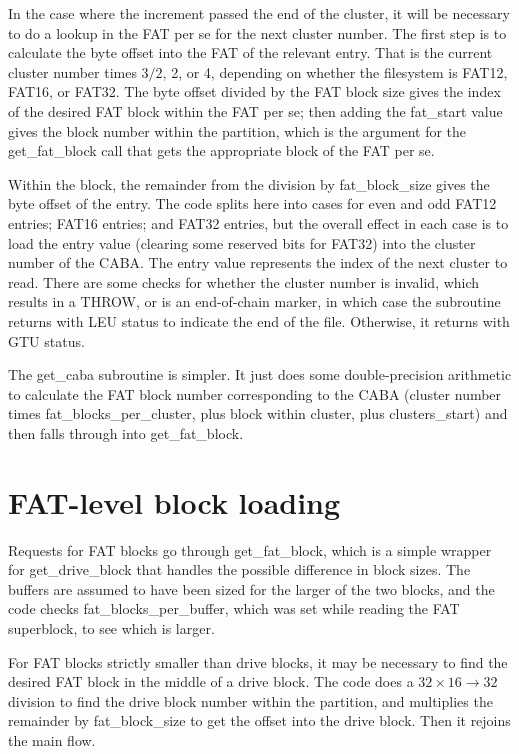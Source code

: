 In the case where the increment passed the end of the cluster, it will be
necessary to do a lookup in the FAT per se for the next cluster number.  The
first step is to calculate the byte offset into the FAT of the relevant
entry.  That is the current cluster number times $3/2$, 2, or 4, depending
on whether the filesystem is FAT12, FAT16, or FAT32.  The byte offset
divided by the FAT block size gives the index of the desired FAT block
within the FAT per se; then adding the fat\_start value gives the block
number within the partition, which is the argument for the get\_fat\_block
call that gets the appropriate block of the FAT per se.

Within the block, the remainder from the division by fat\_block\_size gives
the byte offset of the entry.  The code splits here into cases for even and
odd FAT12 entries; FAT16 entries; and FAT32 entries, but the overall effect
in each case is to load the entry value (clearing some reserved bits for FAT32)
into the cluster number of the CABA.  The entry value represents the index
of the next cluster to read.  There are some checks for whether the cluster
number is invalid, which results in a THROW, or is an end-of-chain marker, in
which case the subroutine returns with LEU status to indicate the end of the
file.  Otherwise, it returns with GTU status.

The get\_caba subroutine is simpler.  It just does some double-precision
arithmetic to calculate the FAT block number corresponding to the CABA
(cluster number times fat\_blocks\_per\_cluster, plus block within cluster,
plus clusters\_start) and then falls through into get\_fat\_block.

\section{FAT-level block loading}

Requests for FAT blocks go through get\_fat\_block, which is a simple
wrapper for get\_drive\_block that handles the possible difference in block
sizes.  The buffers are assumed to have been sized for the larger of the two
blocks, and the code checks fat\_blocks\_per\_buffer, which was set while
reading the FAT superblock, to see which is larger.

For FAT blocks strictly smaller than drive blocks, it may be necessary to
find the desired FAT block in the middle of a drive block.  The code does a
$32\times16\rightarrow32$ division to find the drive block number within the
partition, and multiplies the remainder by fat\_block\_size to get the
offset into the drive block.  Then it rejoins the main flow.

